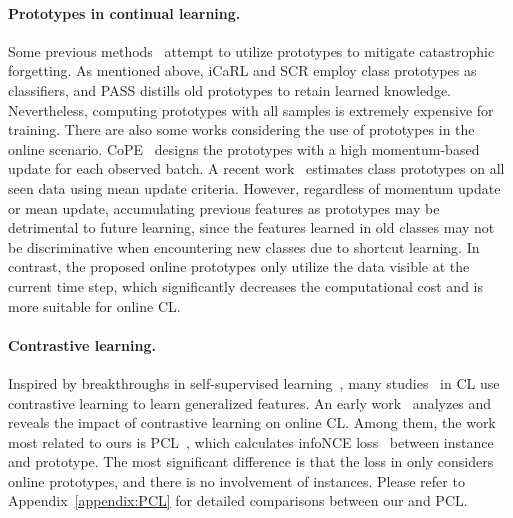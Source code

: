 \paragraph{Prototypes in continual learning.}
Some previous methods~\cite{iCaRL, SCR, protoAug} attempt to utilize prototypes to mitigate catastrophic forgetting. As mentioned above, iCaRL and SCR employ class prototypes as classifiers, and PASS distills old prototypes to retain learned knowledge. Nevertheless, computing prototypes with all samples is extremely expensive for training. There are also some works considering the use of prototypes in the online scenario. CoPE~\cite{online_pro_ema} designs the prototypes with a high momentum-based update for each observed batch. A recent work~\cite{online_pro_accum} estimates class prototypes on all seen data using mean update criteria. However, regardless of momentum update or mean update, accumulating previous features as prototypes may be detrimental to future learning, since the features learned in old classes may not be discriminative when encountering new classes due to shortcut learning. 
In contrast, the proposed online prototypes only utilize the data visible at the current time step, which significantly decreases the computational cost and 
is more suitable for online CL.



\paragraph{Contrastive learning.}
Inspired by breakthroughs in self-supervised learning~\cite{CPC, MoCo, SimCLR, BYOL, SwAV, ProPos}, many studies~\cite{SCR, ER_AML, OCM, Co2L, online_pro_accum} in CL use contrastive learning to learn generalized features. An early work~\cite{ssl4onlineCL} analyzes and reveals the impact of contrastive learning on online CL. Among them, the work most related to ours is PCL~\cite{PCL}, which calculates infoNCE loss~\cite{CPC} between instance and prototype.
The most significant difference is that the loss in \methodname only considers online prototypes, and there is no involvement of instances. 
Please refer to Appendix~\ref{appendix:PCL} for detailed comparisons between our \methodname and PCL.
